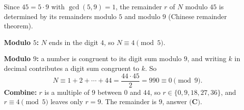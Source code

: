 Since $45=5\cdot9$ with $\gcd(5,9)=1$, the remainder $r$ of $N$ modulo $45$ is determined by its remainders modulo $5$ and modulo $9$ (Chinese remainder theorem).

\textbf{Modulo $5$:} $N$ ends in the digit $4$, so $N\equiv4\pmod5$.

\textbf{Modulo $9$:} a number is congruent to its digit sum modulo $9$, and writing $k$ in decimal contributes a digit sum congruent to $k$. So
\[
N\equiv1+2+\cdots+44=\dfrac{44\cdot45}{2}=990\equiv0\pmod9 .
\]
\textbf{Combine:} $r$ is a multiple of $9$ between $0$ and $44$, so $r\in\{0,9,18,27,36\}$, and $r\equiv4\pmod5$ leaves only $r=9$. The remainder is $\boxed{9}$, answer $\textbf{(C)}$.
